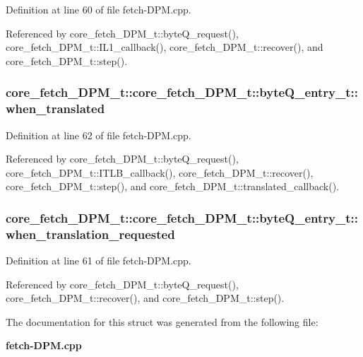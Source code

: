 Definition at line 60 of file fetch-DPM.cpp.

Referenced by core\_\-fetch\_\-DPM\_\-t::byteQ\_\-request(), core\_\-fetch\_\-DPM\_\-t::IL1\_\-callback(), core\_\-fetch\_\-DPM\_\-t::recover(), and core\_\-fetch\_\-DPM\_\-t::step().
\subsubsection[{when\_\-translated}]{ core\_\-fetch\_\-DPM\_\-t::core\_\-fetch\_\-DPM\_\-t::byteQ\_\-entry\_\-t::when\_\-translated}\label{structcore__fetch__DPM__t_1_1byteQ__entry__t_fdda23b68ef848410e50231d13306990}




Definition at line 62 of file fetch-DPM.cpp.

Referenced by core\_\-fetch\_\-DPM\_\-t::byteQ\_\-request(), core\_\-fetch\_\-DPM\_\-t::ITLB\_\-callback(), core\_\-fetch\_\-DPM\_\-t::recover(), core\_\-fetch\_\-DPM\_\-t::step(), and core\_\-fetch\_\-DPM\_\-t::translated\_\-callback().
\subsubsection[{when\_\-translation\_\-requested}]{ core\_\-fetch\_\-DPM\_\-t::core\_\-fetch\_\-DPM\_\-t::byteQ\_\-entry\_\-t::when\_\-translation\_\-requested}\label{structcore__fetch__DPM__t_1_1byteQ__entry__t_478a941e2ddc7c1d19e2ceedfbe3a0a7}




Definition at line 61 of file fetch-DPM.cpp.

Referenced by core\_\-fetch\_\-DPM\_\-t::byteQ\_\-request(), core\_\-fetch\_\-DPM\_\-t::recover(), and core\_\-fetch\_\-DPM\_\-t::step().

The documentation for this struct was generated from the following file:\begin{CompactItemize}
\item 
{\bf fetch-DPM.cpp}\end{CompactItemize}
